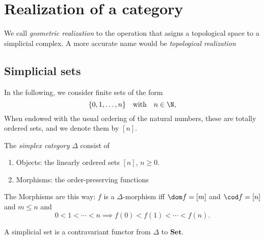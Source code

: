 \chapter{Realization of a category}

We call \textit{geometric realization} to the operation that asigns a topological space to a simplicial complex. A more accurate name would be \textit{topological realization}


\section{Simplicial sets}


In the following, we consider finite sets of the form \[\{0,1,\dots,n\}\quad\text{with}\quad n\in\N,\] 
When  endowed with the usual ordering of the natural numbers, these are totally ordered sets, and we denote them  by \([n]\). %


\begin{definition}
    The \textit{simplex category} \(\Delta\) consist of \begin{enumerate}[label=(\roman*)]
        \item Objects: the linearly ordered sets \([n]\), \(n\geq 0\).
        \item Morphisms: the order-preserving functions
    \end{enumerate}
\end{definition}

\begin{remark}
    The Morphisms are this way: \(f\) is a \(\Delta\)-morphism iff \(\dom f = [m]\)  and \(\cod f = [n]\) and \(m\leq n\) and \[
        0< 1 < \cdots < n \implies f(0) < f(1) < \cdots < f(n).
    \]
\end{remark}


\begin{definition}
    A simplicial set is a contravariant functor from \(\Delta\) to \(\mathbf{Set}\).
    
\end{definition}


